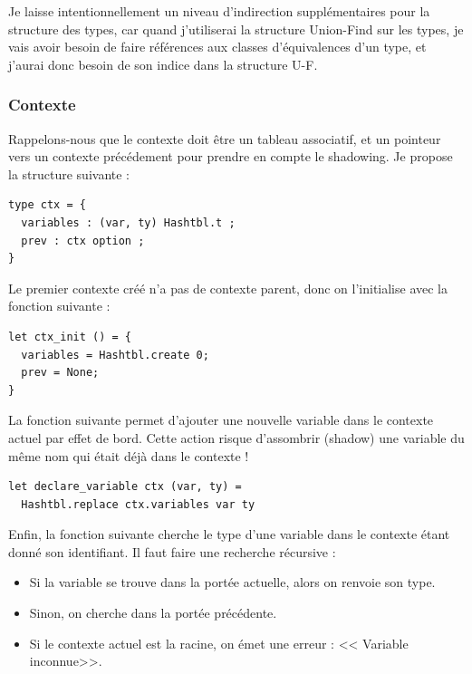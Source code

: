 \documentclass[11pt]{article}
\begin{document}
\begin{remark}
    Je laisse intentionnellement un niveau d'indirection supplémentaires pour la structure des types, car quand j'utiliserai la structure Union-Find sur les types, je vais avoir besoin de faire références aux classes d'équivalences d'un type, et j'aurai donc besoin de son indice dans la structure U-F.
\end{remark}

\subsubsection{Contexte}

Rappelons-nous que le contexte doit être un tableau associatif, et un pointeur vers un contexte précédement pour prendre en compte le shadowing. Je propose la structure suivante :

\begin{lstlisting}
type ctx = {
  variables : (var, ty) Hashtbl.t ;
  prev : ctx option ;
}
\end{lstlisting}

Le premier contexte créé n'a pas de contexte parent, donc on l'initialise avec la fonction suivante :

\begin{lstlisting}
let ctx_init () = {
  variables = Hashtbl.create 0;
  prev = None;
}
\end{lstlisting}

La fonction suivante permet d'ajouter une nouvelle variable dans le contexte actuel par effet de bord. Cette action risque d'assombrir (shadow) une variable du même nom qui était déjà dans le contexte !

\begin{lstlisting}
let declare_variable ctx (var, ty) =
  Hashtbl.replace ctx.variables var ty
\end{lstlisting}

Enfin, la fonction suivante cherche le type d'une variable dans le contexte étant donné son identifiant. Il faut faire une recherche récursive :
\begin{itemize}
    \item Si la variable se trouve dans la portée actuelle, alors on renvoie son type.
    \item Sinon, on cherche dans la portée précédente.
    \item Si le contexte actuel est la racine, on émet une erreur : << Variable inconnue>>.
\end{itemize}
\end{document}
